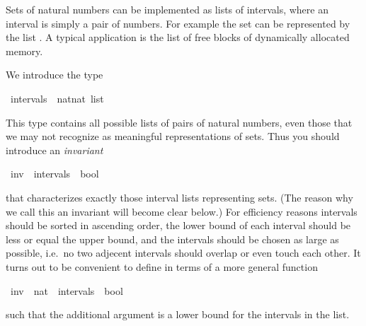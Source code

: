%
\begin{isabellebody}%
\def\isabellecontext{Aufgabe{\isadigit{5}}}%
\isamarkupfalse%
%
\isamarkuptrue%
%
\begin{isamarkuptext}%
Sets of natural numbers can be implemented as lists of
intervals, where an interval is simply a pair of numbers. For example
the set  can be represented by the
list . A typical application
is the list of free blocks of dynamically allocated memory.%
\end{isamarkuptext}%
\isamarkuptrue%
%
\isamarkuptrue%
%
\begin{isamarkuptext}%
We introduce the type%
\end{isamarkuptext}%
\isamarkuptrue%
\ intervals\ {\isacharequal}\ {\isachardoublequote}{\isacharparenleft}nat{\isacharasterisk}nat{\isacharparenright}\ list{\isachardoublequote}\isamarkupfalse%
%
\begin{isamarkuptext}%
This type contains all possible lists of pairs of natural
numbers, even those that we may not recognize as meaningful
representations of sets. Thus you should introduce an \emph{invariant}%
\end{isamarkuptext}%
\isamarkuptrue%
\ inv\ {\isacharcolon}{\isacharcolon}\ {\isachardoublequote}intervals\ {\isacharequal}{\isachargreater}\ bool{\isachardoublequote}\isamarkupfalse%
%
\begin{isamarkuptext}%
that characterizes exactly those interval lists representing
sets.  (The reason why we call this an invariant will become clear
below.)  For efficiency reasons intervals should be sorted in
ascending order, the lower bound of each interval should be less or
equal the upper bound, and the intervals should be chosen as large as
possible, i.e.\ no two adjecent intervals should overlap or even touch
each other.  It turns out to be convenient to define  in
terms of a more general function%
\end{isamarkuptext}%
\isamarkuptrue%
\ inv{}\ {\isacharcolon}{\isacharcolon}\ {\isachardoublequote}nat\ {\isacharequal}{\isachargreater}\ intervals\ {\isacharequal}{\isachargreater}\ bool{\isachardoublequote}\isamarkupfalse%
%
\begin{isamarkuptext}%
such that the additional argument is a lower bound for the
intervals in the list.


\end{isamarkuptext}
\end{isabellebody}
